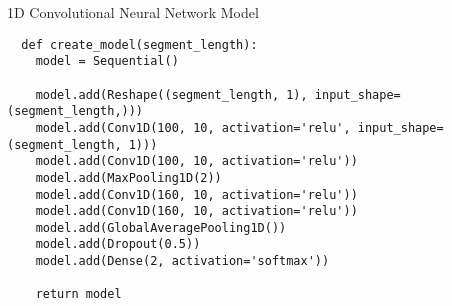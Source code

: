 \begin{code}
  \caption{1D Convolutional Neural Network Model}
  \label{code:1d_conv_net}
  
  \begin{verbatim}
  def create_model(segment_length):
    model = Sequential()

    model.add(Reshape((segment_length, 1), input_shape=(segment_length,)))
    model.add(Conv1D(100, 10, activation='relu', input_shape=(segment_length, 1)))
    model.add(Conv1D(100, 10, activation='relu'))
    model.add(MaxPooling1D(2))
    model.add(Conv1D(160, 10, activation='relu'))
    model.add(Conv1D(160, 10, activation='relu'))
    model.add(GlobalAveragePooling1D())
    model.add(Dropout(0.5))
    model.add(Dense(2, activation='softmax'))

    return model
  \end{verbatim}
\end{code}